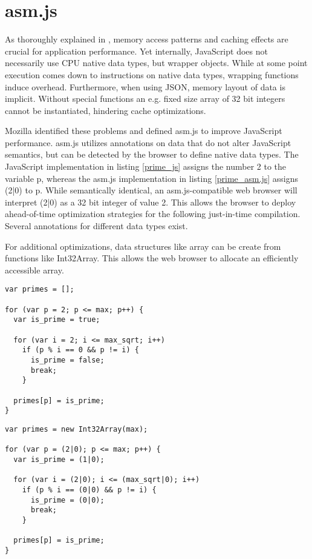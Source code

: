 \section{asm.js} \label{chapter_asm.js}

As thoroughly explained in \cite{memory}, memory access patterns and caching effects are crucial for application performance. Yet internally, JavaScript does not necessarily use CPU native data types, but wrapper objects. While at some point execution comes down to instructions on native data types, wrapping functions induce overhead. Furthermore, when using JSON, memory layout of data is implicit. Without special functions an e.g. fixed size array of 32 bit integers cannot be instantiated, hindering cache optimizations.

Mozilla identified these problems and defined asm.js to improve JavaScript performance. asm.js utilizes annotations on data that do not alter JavaScript semantics, but can be detected by the browser to define native data types. The JavaScript implementation in listing \ref{prime_js} assigns the number 2 to the variable p, whereas the asm.js implementation in listing \ref{prime_asm.js} assigns (2|0) to p. While semantically identical, an asm.js-compatible web browser will interpret (2|0) as a 32 bit integer of value 2. This allows the browser to deploy ahead-of-time optimization strategies for the following just-in-time compilation. Several annotations for different data types exist. \cite{asm.js_spec}

For additional optimizations, data structures like array can be create from functions like Int32Array. This allows the web browser to allocate an efficiently accessible array.

\begin{lstlisting}[frame=single,basicstyle=\footnotesize]
var primes = [];

for (var p = 2; p <= max; p++) {
  var is_prime = true;
  
  for (var i = 2; i <= max_sqrt; i++)
    if (p % i == 0 && p != i) {
      is_prime = false;
      break;
    } 
    
  primes[p] = is_prime;
}
\end{lstlisting}

\begin{lstlisting}[frame=single,basicstyle=\footnotesize]
var primes = new Int32Array(max);

for (var p = (2|0); p <= max; p++) {
  var is_prime = (1|0);  
  
  for (var i = (2|0); i <= (max_sqrt|0); i++)
    if (p % i == (0|0) && p != i) {
      is_prime = (0|0);
      break;
    }
    
  primes[p] = is_prime;
}
\end{lstlisting}


